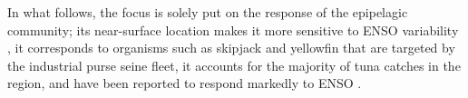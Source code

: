
In what follows, the focus is solely put on the response of the epipelagic community; its near-surface location makes it more sensitive to ENSO variability \citep{lemezoNaturalVariabilityMarine2016}, it corresponds to organisms such as skipjack and yellowfin that are targeted by the industrial purse seine fleet, it accounts for the majority of tuna catches in the region, and have been reported to respond markedly to ENSO \citep{lehodeyNinoSouthernOscillation1997}.
